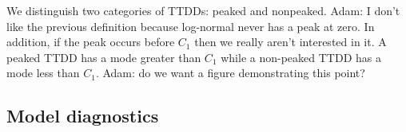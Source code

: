 \documentclass[useAMS,usenatbib,referee,12pt]{article}
\newcommand{\adam}[1]{{\color{blue} ADAM: #1}}
\newcommand{\jarad}[1]{{\color{Orange} #1}}
\begin{document}



We distinguish two categories of TTDDs: peaked and nonpeaked. \jarad{Adam: I don't like the previous definition because log-normal never has a peak at zero. In addition, if the peak occurs before $C_1$ then we really aren't interested in it.}
A peaked TTDD has a mode greater than $C_1$ while a non-peaked TTDD has a mode less than $C_1$. \jarad{Adam: do we want a figure demonstrating this point?}















\subsection{Model diagnostics}
\end{document}
